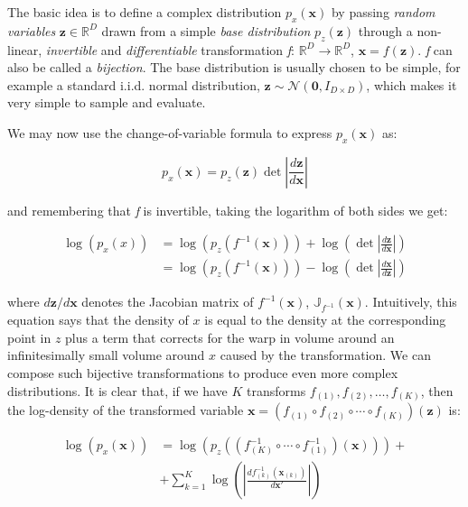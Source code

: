 The basic idea is to define a complex distribution $p_x(\mathbf{x})$ by passing \emph{random variables} $\mathbf{z} \in \mathbb{R}^D$ drawn from a simple \emph{base distribution} $p_z(\mathbf{z})$ through a non-linear, \emph{invertible} and \emph{differentiable} transformation \emph{f}: $\mathbb{R}^D \rightarrow \mathbb{R}^D$, $\mathbf{x} = f(\mathbf{z})$. \emph{f} can also be called a \emph{bijection}. The base distribution is usually chosen to be simple, for example a standard i.i.d. normal distribution, $\mathbf{z}\sim\mathcal{N}(\mathbf{0},I_{D\times D})$, which makes it very simple to sample and evaluate. 

We may now use the change-of-variable formula to express $p_x(\mathbf{x})$ as:

\[
p_x(\mathbf{x}) = p_z(\mathbf{z})\det\left|\frac{d\mathbf{z}}{d\mathbf{x}}\right|
\]

and remembering that \emph{f} is invertible, taking the logarithm of both sides we get:

\begin{equation}\label{eqn:logpdf}
	\begin{aligned}
		\log(p_x(x)) &= \log(p_z(f^{-1}(\mathbf{x})))+\log\left(\det\left|\frac{d\mathbf{z}}{d\mathbf{x}}\right|\right)\\
		&= \log(p_z(f^{-1}(\mathbf{x})))-\log\left(\det\left|\frac{d\mathbf{x}}{d\mathbf{z}}\right|\right)
	\end{aligned}
\end{equation}

where $d\mathbf{z}/d\mathbf{x}$ denotes the Jacobian matrix of $f^{-1}(\mathbf{x})$, $\mathbb{J}_{f^{-1}}(\mathbf{x})$.
Intuitively, this equation says that the density of $x$ is equal to the density at the corresponding point in $z$ plus a term that corrects for the warp in volume around an infinitesimally small volume around $x$ caused by the transformation.
	We can compose such bijective transformations to produce even more complex distributions. It is clear that, if we have $K$ transforms $f_{(1)}, f_{(2)},\ldots,f_{(K)}$, then the log-density of the transformed variable $\mathbf{x}=(f_{(1)}\circ f_{(2)}\circ\cdots\circ f_{(K)})(\mathbf{z})$ is:
	
	\begin{equation*}
		\begin{aligned}
			\log(p_x(\mathbf{x})) &= \log\left(p_z\left(\left(f_{(K)}^{-1}\circ\cdots\circ f_{(1)}^{-1}\right)\left(\mathbf{x}\right)\right)\right)+\\
			&+\sum^{K}_{k=1}\log\left(\left|\frac{df^{-1}_{(k)}(\mathbf{x}_{(k)})}{d\mathbf{x}'}\right|\right)
		\end{aligned}
	\end{equation*}
	
